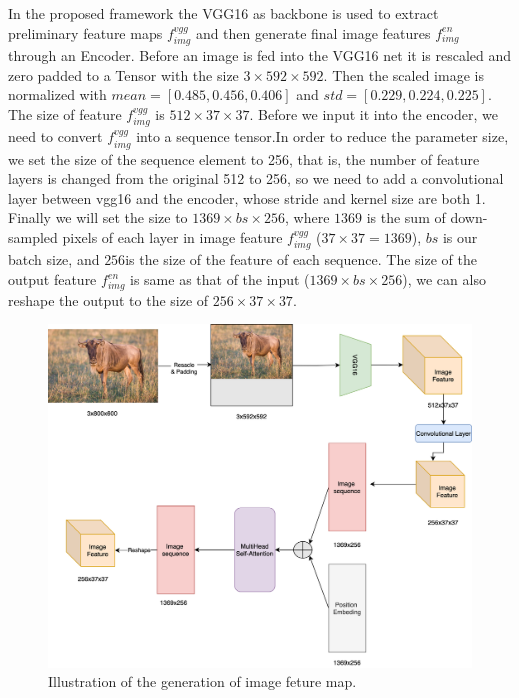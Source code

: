 In the proposed framework the VGG16 as backbone is used to extract preliminary feature maps $f^{vgg}_{img}$ and  then generate final image features $f^{en}_{img}$ through an Encoder. Before an image is fed into the VGG16 net it is rescaled and zero padded to a Tensor with the size $ 3\times592\times592 $. Then the scaled image is normalized with $ mean = [0.485, 0.456, 0.406 ]$ and $ std = [ 0.229, 0.224, 0.225]$.   The size of feature $f^{vgg}_{img}$ is $512 \times 37 \times 37$. Before we input it into the encoder, we need to convert $f^{vgg}_{img}$  into a sequence tensor.In order to reduce the parameter size, we set the size of the sequence element to 256, that is, the number of feature layers is changed from the original 512 to 256, so we need to add a convolutional layer between vgg16 and the encoder, whose stride and kernel size are both 1. Finally we will set the size to $ 1369 \times bs \times 256 $, where $ 1369 $ is the sum of down-sampled pixels of each layer in image feature $f^{vgg}_{img}$ ($ 37 \times 37 = 1369$), $ bs $ is our batch size, and $ 256  $is the size of the feature of each sequence. The size of the output feature $f^{en}_{img}$ is same as that of the input ($ 1369 \times bs \times 256 $), we can also reshape the output to the size of $256 \times 37 \times 37$.


\begin{figure}[tbph!]
	\centering
	\includegraphics[width=0.9\linewidth]{figures/img_feat_baseline}
	\caption[Generation of Image Feature Map]{Illustration of the generation of image feture map.}
	\label{fig:imgfeatbaseline}
\end{figure}


